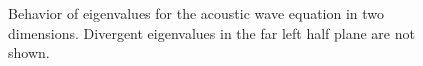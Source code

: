 \documentclass[10pt]{article}
\begin{document}
\begin{figure}
\centering
{}
\hspace{2em}
\caption{Behavior of eigenvalues for the acoustic wave equation in two dimensions.  Divergent eigenvalues in the far left half plane are not shown.  }
\label{fig:trackEigsWave}
\end{figure}
\end{document}
